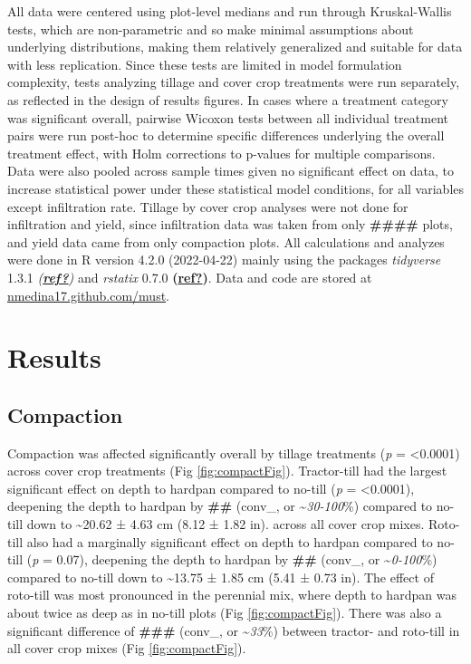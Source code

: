 \documentclass[
]{article}
\begin{document}
All data were centered using plot-level medians and run through Kruskal-Wallis tests, which are non-parametric and so make minimal assumptions about underlying distributions, making them relatively generalized and suitable for data with less replication.
Since these tests are limited in model formulation complexity, tests analyzing tillage and cover crop treatments were run separately, as reflected in the design of results figures.
In cases where a treatment category was significant overall, pairwise Wicoxon tests between all individual treatment pairs were run post-hoc to determine specific differences underlying the overall treatment effect, with Holm corrections to p-values for multiple comparisons.
Data were also pooled across sample times given no significant effect on data, to increase statistical power under these statistical model conditions, for all variables except infiltration rate.
Tillage by cover crop analyses were not done for infiltration and yield, since infiltration data was taken from only \textbf{\#\#\#\#} plots, and yield data came from only compaction plots.
All calculations and analyzes were done in R version 4.2.0 (2022-04-22) mainly using the packages \emph{tidyverse} 1.3.1 \emph{(\protect\hyperlink{ref-ref}{\textbf{ref?}})} and \emph{rstatix} 0.7.0 \textbf{(\protect\hyperlink{ref-ref}{\textbf{ref?}})}.
Data and code are stored at \url{nmedina17.github.com/must}.

\hypertarget{results}{%
\section{Results}\label{results}}

\hypertarget{compaction-1}{%
\subsection{Compaction}\label{compaction-1}}

Compaction was affected significantly overall by tillage treatments (\emph{p} = \textless0.0001) across cover crop treatments (Fig \ref{fig:compactFig}).
Tractor-till had the largest significant effect on depth to hardpan compared to no-till (\emph{p} = \textless0.0001),
deepening the depth to hardpan by \textbf{\#\#} (conv\_, or \textasciitilde{}\emph{30-100}\%) compared to no-till down to \textasciitilde20.62 ±
4.63 cm
(8.12 ±
1.82 in).
across all cover crop mixes.
Roto-till also had a marginally significant effect on depth to hardpan compared to no-till (\emph{p} = 0.07),
deepening the depth to hardpan by \textbf{\#\#} (conv\_, or \textasciitilde{}\emph{0-100}\%) compared to no-till down to \textasciitilde13.75 ±
1.85 cm
(5.41 ±
0.73 in).
The effect of roto-till was most pronounced in the perennial mix, where depth to hardpan was about twice as deep as in no-till plots (Fig \ref{fig:compactFig}).
There was also a significant difference of \textbf{\#\#\#} (conv\_, or \textasciitilde{}\emph{33}\%) between tractor- and roto-till in all cover crop mixes (Fig \ref{fig:compactFig}).
\end{document}
